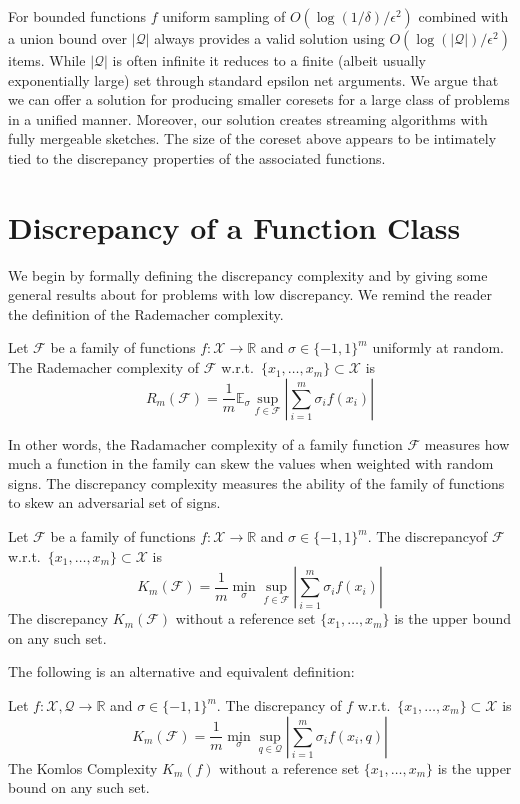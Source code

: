 \documentclass[anon,12pt]{colt2019} %
\newcommand{\R}{\mathbb{R}}
\newcommand{\E}{\mathbb{E}}
\newcommand{\eps}{\epsilon}
\newcommand{\F}{\mathcal{F}}
\newcommand{\X}{\mathcal{X}}
\newcommand{\Q}{\mathcal{Q}}
\begin{document}
For bounded functions $f$ uniform sampling of $O(\log(1/\delta)/\eps^2)$ combined with a union bound over $|\mathcal Q|$ always provides a valid solution using $O(\log(|\mathcal Q|)/\eps^2)$ items. 
While $|\mathcal Q|$ is often infinite it reduces to a finite (albeit usually exponentially large) set through standard epsilon net arguments. 
%
We argue that we can offer a solution for producing smaller coresets for a large class of problems in a unified manner. 
Moreover, our solution creates streaming algorithms with fully mergeable sketches. 
The size of the coreset above appears to be intimately tied to the discrepancy properties of the associated functions.


\section{Discrepancy of a Function Class}
We begin by formally defining the discrepancy complexity and by giving some general results about for problems with low discrepancy. We remind the reader the definition of the Rademacher complexity.

\begin{definition}
Let $\F$ be a family of functions $f:\X\rightarrow\R$ and $\sigma \in \{-1,1\}^m$ uniformly at random. 
The Rademacher complexity of $\F$ w.r.t.\ $\{x_1,\ldots,x_m\} \subset \X$ is 
\[
R_m(\F) =  \frac{1}{m}\E_{\sigma} \sup_{f \in \F}  \left| \sum_{i=1}^{m}\sigma_i f(x_i) \right|
\]
\end{definition}
%
In other words, the Radamacher complexity of a family function $\F$ measures how much a function in the family can skew the values when weighted with random signs. The discrepancy complexity measures the ability of the family of functions to skew an adversarial set of signs.

\begin{definition}
Let $\F$ be a family of functions $f:\X\rightarrow\R$ and $\sigma \in \{-1,1\}^m$. 
The discrepancyof $\F$ w.r.t.\ $\{x_1,\ldots,x_m\} \subset \X$ is 
\[
K_m(\F) =  \frac{1}{m}\min_{\sigma} \sup_{f \in \F}  \left|\sum_{i=1}^{m}\sigma_i f(x_i)\right|
\]
The discrepancy $K_m(\F)$ without a reference set $\{x_1,\ldots,x_m\}$ is the upper bound on any such set.
\end{definition}
The following is an alternative and equivalent definition:
\begin{definition}
Let $f:\X,\Q\rightarrow\R$ and $\sigma \in \{-1,1\}^m$. 
The discrepancy of $f$ w.r.t.\ $\{x_1,\ldots,x_m\} \subset \X$ is 
\[
K_m(\F) =  \frac{1}{m}\min_{\sigma} \sup_{q \in \Q}  \left|\sum_{i=1}^{m}\sigma_i f(x_i,q)\right|
\]
The Komlos Complexity $K_m(f)$ without a reference set $\{x_1,\ldots,x_m\}$ is the upper bound on any such set.
\end{definition}
\end{document}
